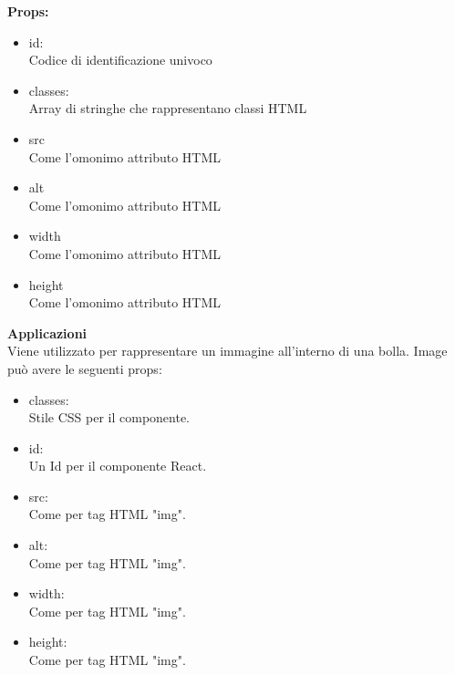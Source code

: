 \textbf{Props:} 
\begin{itemize}
\item id: 
\\
Codice di identificazione univoco
\item classes: 
\\
Array di stringhe che rappresentano classi HTML
\item src
\\
Come l'omonimo attributo HTML
\item alt
\\
Come l'omonimo attributo HTML
\item width
\\
Come l'omonimo attributo HTML
\item height
\\
Come l'omonimo attributo HTML

\end{itemize} 


\textbf{Applicazioni}\\
Viene utilizzato per rappresentare un immagine all'interno di una bolla.
Image può avere le seguenti props:
\begin{itemize}
\item classes:
\\
Stile CSS per il componente.
\item id:
\\
Un Id per il componente React.
\item src: 
\\
Come per tag HTML "img".
\item alt: 
\\
Come per tag HTML "img".
\item width: \\
Come per tag HTML "img".
\item height: \\
Come per tag HTML "img".
\end{itemize} 


\clearpage

